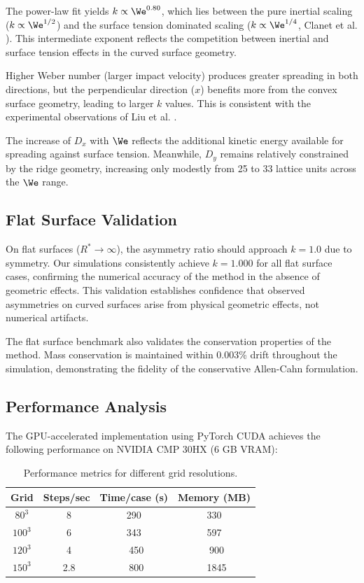 The power-law fit yields $k \propto \We^{0.80}$, which lies between the pure inertial scaling ($k \propto \We^{1/2}$) and the surface tension dominated scaling ($k \propto \We^{1/4}$, Clanet et al. \cite{clanet2004maximal}). This intermediate exponent reflects the competition between inertial and surface tension effects in the curved surface geometry.

Higher Weber number (larger impact velocity) produces greater spreading in both directions, but the perpendicular direction ($x$) benefits more from the convex surface geometry, leading to larger $k$ values. This is consistent with the experimental observations of Liu et al. \cite{liu2015symmetry}.

The increase of $D_x$ with $\We$ reflects the additional kinetic energy available for spreading against surface tension. Meanwhile, $D_y$ remains relatively constrained by the ridge geometry, increasing only modestly from 25 to 33 lattice units across the $\We$ range.

\subsection{Flat Surface Validation}

On flat surfaces ($R^* \to \infty$), the asymmetry ratio should approach $k = 1.0$ due to symmetry. Our simulations consistently achieve $k = 1.000$ for all flat surface cases, confirming the numerical accuracy of the method in the absence of geometric effects. This validation establishes confidence that observed asymmetries on curved surfaces arise from physical geometric effects, not numerical artifacts.

The flat surface benchmark also validates the conservation properties of the method. Mass conservation is maintained within 0.003\% drift throughout the simulation, demonstrating the fidelity of the conservative Allen-Cahn formulation.

\subsection{Performance Analysis}

The GPU-accelerated implementation using PyTorch CUDA achieves the following performance on NVIDIA CMP 30HX (6 GB VRAM):

\begin{table}[htbp]
    \centering
    \caption{Performance metrics for different grid resolutions.}
    \label{tab:performance}
    \begin{tabular}{cccc}
        \toprule
        Grid & Steps/sec & Time/case (s) & Memory (MB) \\
        \midrule
        $80^3$ & ~8 & 290 & 330 \\
        $100^3$ & ~6 & 343 & 597 \\
        $120^3$ & ~4 & ~450 & ~900 \\
        $150^3$ & ~2.8 & ~800 & ~1845 \\
        \bottomrule
    \end{tabular}
\end{table}

